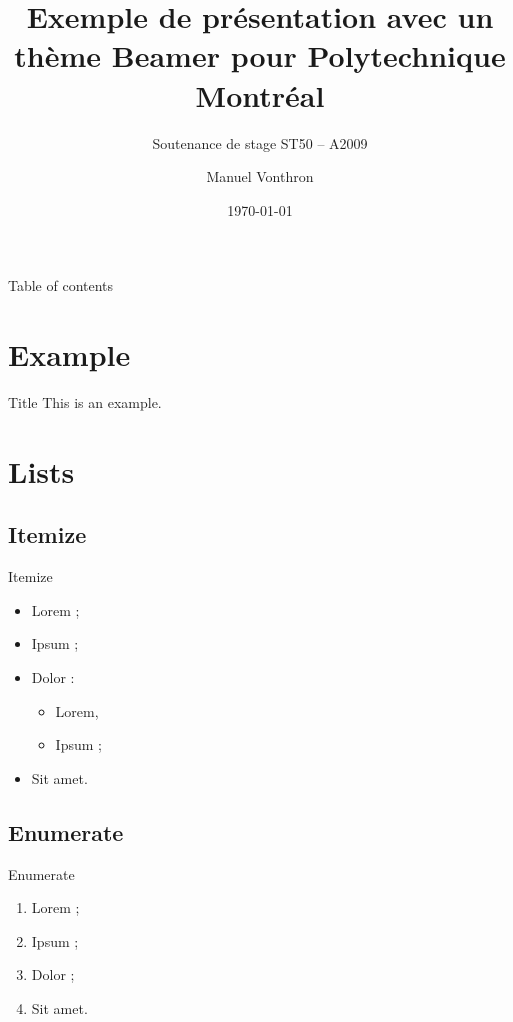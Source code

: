 \documentclass{beamer}
\begin{document}
\title[Th\`eme Beamer Polymtl]{Exemple de présentation avec un thème Beamer pour Polytechnique Montréal} 
\subtitle{Soutenance de stage ST50 -- A2009}
\author{Manuel Vonthron} 
\date{\today} 


\begin{frame}[plain]
  \titlepage
\end{frame}


\begin{frame}{Table of contents}
  \tableofcontents
\end{frame}


\section{Example} 
\begin{frame}{Title} 
  This is an example.
\end{frame}


\section{Lists} 
\subsection{Itemize}

\begin{frame}{Itemize}
  \begin{itemize}
    \item Lorem ; \pause
    \item Ipsum ;
    \item Dolor : \pause
      \begin{itemize}
        \item Lorem,
        \item Ipsum ;
      \end{itemize}
    \item Sit amet.
  \end{itemize} 
\end{frame}


\subsection{Enumerate}
\begin{frame}{Enumerate}
  \begin{enumerate}
    \item Lorem ; \pause
    \item Ipsum ;
    \item Dolor ;
    \item Sit amet.
  \end{enumerate}
\end{frame}
\end{document}
